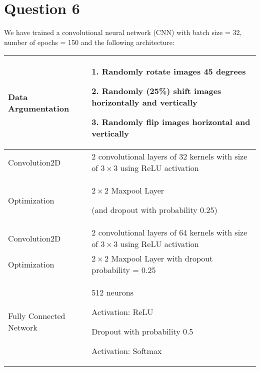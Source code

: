 \documentclass[12pt, a4paper]{article}
\begin{document}
\section*{Question 6}

We have trained a convolutional neural network (CNN) with batch size = 32, number of epochs = 150 and the following architecture:
\begin{center}
\begin{tabular} { C{4cm} | L{11cm} }
    Data Argumentation & 1. Randomly rotate images 45 degrees\par
    2. Randomly (25\%) shift images horizontally and vertically\par
    3. Randomly flip images horizontal and vertically \\ \hline

    Convolution2D & 2 convolutional layers of 32 kernels with size of $3 \times 3$ using ReLU activation \\ \hline

    Optimization & $2 \times 2$ Maxpool Layer\par
    (and dropout with probability 0.25) \\ \hline

    Convolution2D & 2 convolutional layers of 64 kernels with size of $3 \times 3$ using ReLU activation \\ \hline

    Optimization & $2 \times 2$ Maxpool Layer with dropout probability = 0.25 \\ \hline

    Fully Connected Network & 512 neurons\par
    Activation: ReLU\par
    Dropout with probability 0.5\par
    Activation: Softmax \\
\end{tabular}
\end{center}
\bigskip
\end{document}
